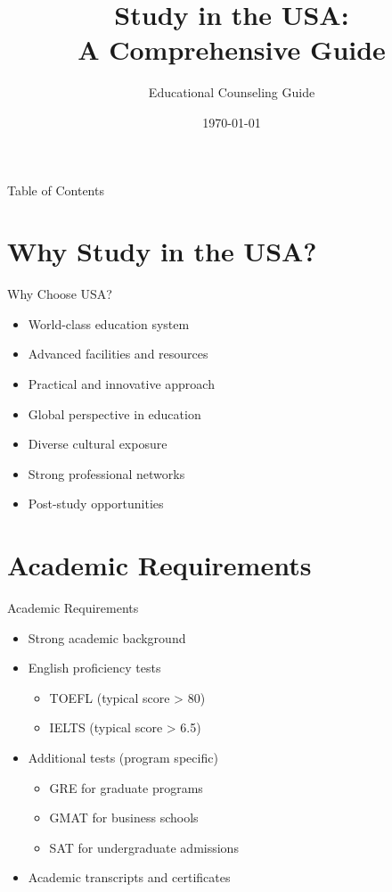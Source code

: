 \documentclass{beamer}
\title{Study in the USA:\\A Comprehensive Guide}
\author{Educational Counseling Guide}
\date{\today}
\begin{document}
\begin{frame}
\titlepage
\end{frame}

\begin{frame}{Table of Contents}
\tableofcontents
\end{frame}

\section{Why Study in the USA?}
\begin{frame}{Why Choose USA?}
\begin{itemize}
\item World-class education system
\item Advanced facilities and resources
\item Practical and innovative approach
\item Global perspective in education
\item Diverse cultural exposure
\item Strong professional networks
\item Post-study opportunities
\end{itemize}
\end{frame}

\section{Academic Requirements}
\begin{frame}{Academic Requirements}
\begin{itemize}
\item Strong academic background
\item English proficiency tests
    \begin{itemize}
    \item TOEFL (typical score > 80)
    \item IELTS (typical score > 6.5)
    \end{itemize}
\item Additional tests (program specific)
    \begin{itemize}
    \item GRE for graduate programs
    \item GMAT for business schools
    \item SAT for undergraduate admissions
    \end{itemize}
\item Academic transcripts and certificates
\end{itemize}
\end{frame}
\end{document}
